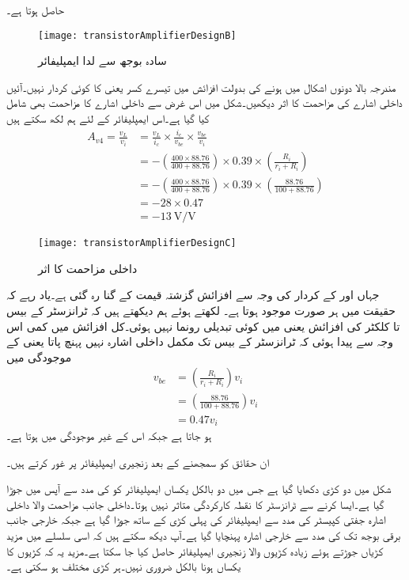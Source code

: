 حاصل ہوتا ہے۔
%
\begin{figure}
\centering
\texttt{[image: transistorAmplifierDesignB]}
\caption{سادہ بوجھ سے لدا ایمپلیفائر}
\label{شکل_سادہ_ایمپلیفائر_بار_کے_اثرات_ب}
\end{figure}
مندرجہ بالا دونوں اشکال میں  ہونے کی بدولت افزائش میں تیسرے کسر یعنی  کا کوئی کردار نہیں۔آئیں داخلی اشارے کی مزاحمت کا اثر دیکھیں۔شکل  میں اس غرض سے داخلی اشارے کا مزاحمت بھی شامل کیا گیا ہے۔اس ایمپلیفائر کے لئے ہم لکھ سکتے ہیں
\begin{align*}
A_{v4}=\frac{v_L}{v_i}&=\frac{v_L}{i_c} \times \frac{i_c}{v_{be}} \times \frac{v_{be}}{v_i}\\
&=-\left(\frac{400 \times 88.76}{400+88.76} \right) \times 0.39 \times \left(\frac{R_i}{r_i+R_i} \right)\\
&=-\left(\frac{400 \times 88.76}{400+88.76} \right) \times 0.39 \times \left(\frac{88.76}{100+88.76} \right)\\
&=-28 \times 0.47\\
&=\SI[per=frac,fraction=nice]{-13}{\volt \per \volt}
\end{align*}
%
\begin{figure}
\centering
\texttt{[image: transistorAmplifierDesignC]}
\caption{داخلی مزاحمت کا اثر}
\label{شکل_سادہ_ایمپلیفائر_داخلی_مزاحمت_کا_اثر}
\end{figure}
جہاں  اور  کے کردار کی وجہ سے افزائش گزشتہ قیمت کے  گنا رہ گئی ہے۔یاد رہے کہ حقیقت میں  ہر صورت موجود ہوتا ہے۔ لکھتے ہوئے ہم دیکھتے ہیں کہ ٹرانزسٹر کے بیس تا کلکٹر  کی افزائش  یعنی  میں کوئی تبدیلی رونما نہیں ہوئی۔کل افزائش  میں کمی اس وجہ سے پیدا ہوئی کہ ٹرانزسٹر کے بیس تک مکمل داخلی اشارہ نہیں پہنچ پاتا یعنی  کے موجودگی میں
\begin{align*}
v_{be}&=\left(\frac{R_i}{r_i+R_i} \right) v_i\\
&=\left(\frac{88.76}{100+88.76} \right)v_i\\
&=0.47 v_i
\end{align*}
ہو جاتا ہے جبکہ اس کے غیر موجودگی میں  ہوتا ہے۔

ان حقائق کو سمجھنے کے بعد زنجیری ایمپلیفائر پر غور کرتے ہیں۔

شکل  میں دو کڑی  دکھایا گیا ہے جس میں دو بالکل یکساں ایمپلیفائر کو   کی مدد سے آپس میں جوڑا گیا ہے۔ایسا کرنے سے ٹرانزسٹر کا نقطہ کارکردگی متاثر نہیں ہوتا۔داخلی جانب  مزاحمت والا داخلی اشارہ  جفتی کپیسٹر  کی مدد سے ایمپلیفائر کی پہلی کڑی کے ساتھ جوڑا گیا ہے جبکہ خارجی جانب برقی بوجھ  تک  کی مدد سے خارجی اشارہ پہنچایا گیا ہے۔آپ دیکھ سکتے ہیں کہ اسی سلسلے میں مزید کڑیاں جوڑتے ہوئے زیادہ کڑیوں والا زنجیری ایمپلیفائر حاصل کیا جا سکتا ہے۔مزید یہ کہ کڑیوں کا یکساں ہونا بالکل ضروری نہیں۔ہر کڑی مختلف ہو سکتی ہے۔

